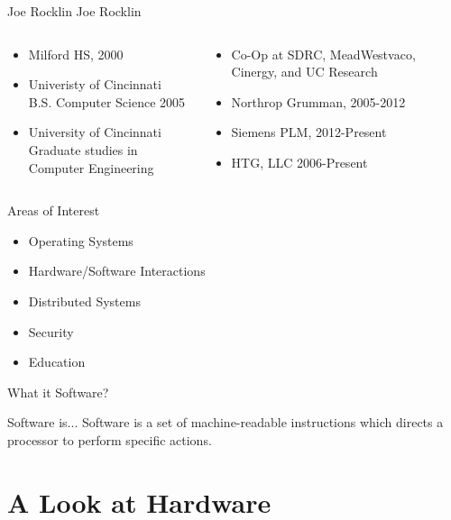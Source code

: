 \documentclass[serif,mathserif,compress]{beamer}
\begin{document}
\begin{frame}{Joe Rocklin}
  Joe Rocklin
  \begin{columns}[T]
  \begin{column}[T]{.5\textwidth}
    \begin{itemize}
    \item Milford HS, 2000
    \item Univeristy of Cincinnati\\B.S. Computer Science 2005
    \item University of Cincinnati\\Graduate studies in Computer Engineering
    \end{itemize}
  \end{column}
  \pause
  \begin{column}[T]{.5\textwidth}
    \begin{itemize}
    \item Co-Op at SDRC, MeadWestvaco, Cinergy, and UC Research
    \item Northrop Grumman, 2005-2012
    \item Siemens PLM, 2012-Present
    \item HTG, LLC 2006-Present
    \end{itemize}
  \end{column}
  \end{columns}
\end{frame}

\begin{frame}{Areas of Interest}
  \begin{itemize}
  \item Operating Systems
  \item Hardware/Software Interactions
  \item Distributed Systems
  \item Security
  \item Education
  \end{itemize}
\end{frame}

\begin{frame}{What it Software?}
  \begin{block}{Software is...}
    Software is a set of machine-readable instructions which directs a processor to perform specific actions.
  \end{block}
\end{frame}

\section{A Look at Hardware}
\end{document}
